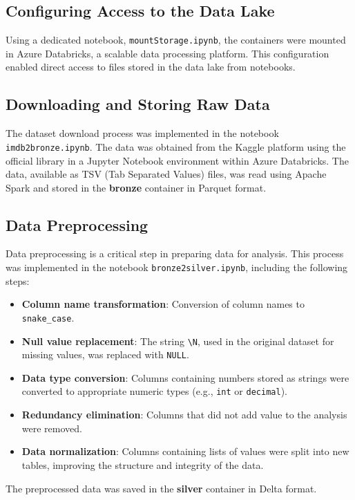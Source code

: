 \documentclass[a4paper,12pt]{article}
\begin{document}
\subsection{Configuring Access to the Data Lake}
Using a dedicated notebook, \texttt{mountStorage.ipynb}, the containers were mounted in 
Azure Databricks, a scalable data processing platform. This configuration enabled direct 
access to files stored in the data lake from notebooks.

\subsection{Downloading and Storing Raw Data}
The dataset download process was implemented in the notebook \texttt{imdb2bronze.ipynb}. The data 
was obtained from the Kaggle platform using the official library in a Jupyter Notebook environment 
within Azure Databricks. The data, available as TSV (Tab Separated Values) files, was read using 
Apache Spark and stored in the \textbf{bronze} container in Parquet format.

\subsection{Data Preprocessing}
Data preprocessing is a critical step in preparing data for analysis. This process was implemented in the notebook \texttt{bronze2silver.ipynb}, including the following steps:

\begin{itemize}
    \item \textbf{Column name transformation}: Conversion of column names to \texttt{snake\_case}.
    \item \textbf{Null value replacement}: The string \texttt{\textbackslash N}, used in the original dataset for missing values, was replaced with \texttt{NULL}.
    \item \textbf{Data type conversion}: Columns containing numbers stored as strings were converted to appropriate numeric types (e.g., \texttt{int} or \texttt{decimal}).
    \item \textbf{Redundancy elimination}: Columns that did not add value to the analysis were removed.
    \item \textbf{Data normalization}: Columns containing lists of values were split into new tables, improving the structure and integrity of the data.
\end{itemize}

The preprocessed data was saved in the \textbf{silver} container in Delta format.
\end{document}

